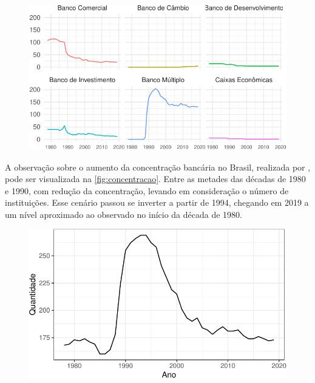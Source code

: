 \documentclass[12pt,12pt,openright,oneside,a4paper,chapter=TITLE,section=TITLE,subsection=TITLE,subsubsection=TITLE,english,french,spanish,portugues,sumario=tradicional]{abntex2}
\begin{document}
\begin{figure}

\begin{center}\includegraphics{12-exportedfigures/bank evolution-1} \end{center}
\label{fig:segmento}
\end{figure}

A observação sobre o aumento da concentração bancária no Brasil, realizada por
\textcite{camargo:2009}, pode ser visualizada na \autoref{fig:concentracao}.
Entre as metades das décadas de 1980 e 1990, com redução da concentração,
levando em consideração o número de instituições. Esse cenário passou se
inverter a partir de 1994, chegando em 2019 a um nível aproximado ao observado
no início da década de 1980.

\begin{figure}

\begin{center}\includegraphics{12-exportedfigures/concetration-1} \end{center}
\label{fig:concentracao}
\end{figure}
\end{document}
